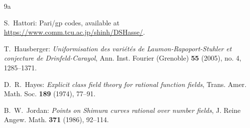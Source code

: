 \documentclass[10pt]{amsart}
\theoremstyle{plain}
\theoremstyle{definition}
\newcommand{\frn}{\mathfrak{n}}
\newcommand{\frp}{\mathfrak{p}}
\begin{document}
\begin{thebibliography}{9a}

S.~Hattori: Pari/gp codes, available at \url{https://www.comm.tcu.ac.jp/shinh/DSHasse/}.







T.~Hausberger:
\emph{Uniformisation des vari\'{e}t\'{e}s de Laumon-Rapoport-Stuhler et conjecture de Drinfeld-Carayol},
Ann. Inst. Fourier (Grenoble) \textbf{55} (2005), no. 4, 1285--1371.

D.~R.~Hayes:
\emph{Explicit class field theory for rational function fields},
Trans. Amer. Math. Soc. \textbf{189} (1974), 77--91.





B.~W.~Jordan:
\emph{Points on Shimura curves rational over number fields}, J. Reine Angew. Math. \textbf{371} (1986), 92--114.


\end{thebibliography}
\end{document}
